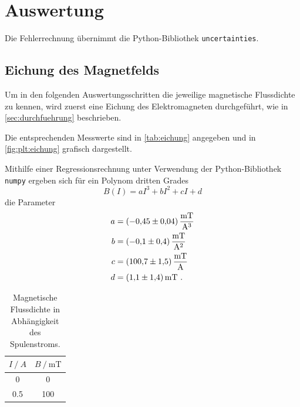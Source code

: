 \section{Auswertung}
\label{sec:auswertung}

Die Fehlerrechnung übernimmt die Python-Bibliothek \texttt{uncertainties}.

\subsection{Eichung des Magnetfelds} \label{sec:auswertung:eichung}
Um in den folgenden Auswertungsschritten
die jeweilige magnetische Flussdichte zu kennen,
wird zuerst eine Eichung des Elektromagneten durchgeführt,
wie in \autoref{sec:durchfuehrung} beschrieben.

Die entsprechenden Messwerte sind in \autoref{tab:eichung} angegeben
und in \autoref{fig:plt:eichung} grafisch dargestellt.

Mithilfe einer Regressionsrechnung unter Verwendung der Python-Bibliothek \texttt{numpy} %
ergeben sich für ein Polynom dritten Grades
\[
    B(I) = aI^3 + bI^2 + cI + d
\]
die Parameter
\begin{align*}
    a &= \SI{-0.45 \pm 0.04}{\milli\tesla\per\cubic\ampere} \\
    b &= \SI{-0.1 \pm 0.4}{\milli\tesla\per\square\ampere} \\
    c &= \SI{100.7 \pm 1.5}{\milli\tesla\per\ampere} \\
    d &= \SI{1.1 \pm 1.4}{\milli\tesla} \ .
\end{align*}

\begin{table}
    \centering
    \caption{Magnetische Flussdichte in Abhängigkeit des Spulenstroms.}
    \label{tab:eichung}
    \begin{tabular}{S S}
        \toprule
        {$I \mathbin{/} \si{A}$} & {$B \mathbin{/} \si{\milli\tesla}$} \\
         & 0 \\
        0.5 & 100 \\
        \bottomrule
    \end{tabular}
\end{table}

